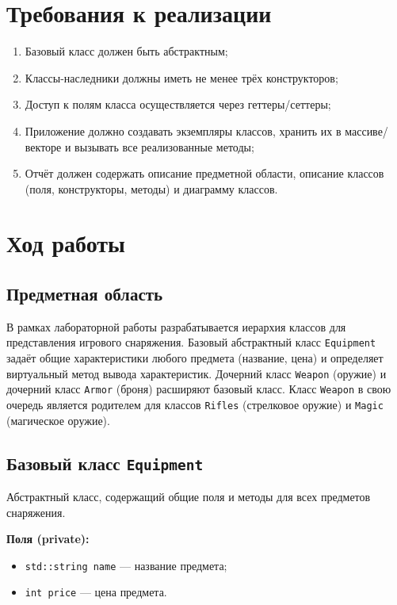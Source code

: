 \documentclass[oneside,a4paper,14pt]{extarticle}
\begin{document}
\section*{\normalsize Требования к реализации}
\begin{enumerate}
    \item Базовый класс должен быть абстрактным;
    \item Классы-наследники должны иметь не менее трёх конструкторов;
    \item Доступ к полям класса осуществляется через геттеры/сеттеры;
    \item Приложение должно создавать экземпляры классов, хранить их в массиве/векторе и вызывать все реализованные методы;
    \item Отчёт должен содержать описание предметной области, описание классов (поля, конструкторы, методы) и диаграмму классов.
\end{enumerate}

\newpage
\section*{\normalsize Ход работы}

\subsection*{Предметная область}
В рамках лабораторной работы разрабатывается иерархия классов для представления игрового снаряжения. Базовый абстрактный класс \texttt{Equipment} задаёт общие характеристики любого предмета (название, цена) и определяет виртуальный метод вывода характеристик. Дочерний класс \texttt{Weapon} (оружие) и дочерний класс \texttt{Armor} (броня) расширяют базовый класс. Класс \texttt{Weapon} в свою очередь является родителем для классов \texttt{Rifles} (стрелковое оружие) и \texttt{Magic} (магическое оружие).

\subsection*{Базовый класс \texttt{Equipment}}
Абстрактный класс, содержащий общие поля и методы для всех предметов снаряжения.

\textbf{Поля (private):}
\begin{itemize}
    \item \texttt{std::string name} — название предмета;
    \item \texttt{int price} — цена предмета.
\end{itemize}
\end{document}
